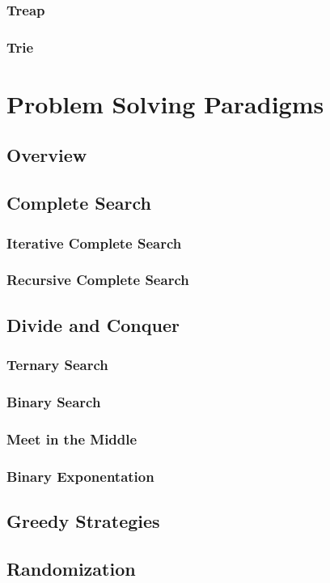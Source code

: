 \documentclass[titlepage]{article}
\begin{document}
\subsubsection{Treap}
\subsubsection{Trie}

\newpage

\section{Problem Solving Paradigms}
\subsection{Overview}
\subsection{Complete Search}
\subsubsection{Iterative Complete Search}
\subsubsection{Recursive Complete Search}
\subsection{Divide and Conquer}
\subsubsection{Ternary Search}
\subsubsection{Binary Search}
\subsubsection{Meet in the Middle}
\subsubsection{Binary Exponentation}
\subsection{Greedy Strategies}
\subsection{Randomization}
\end{document}
